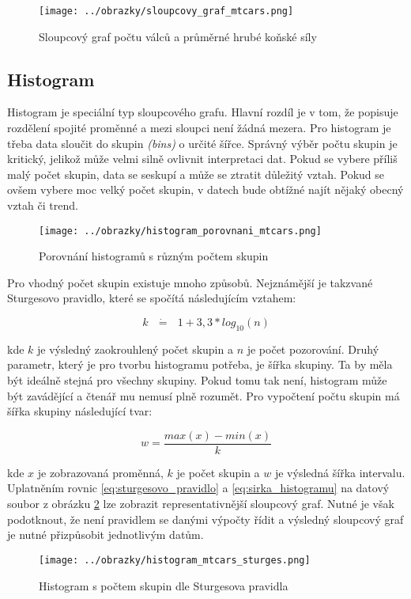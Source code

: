 \begin{figure}[H]
    \centering
    \texttt{[image: ../obrazky/sloupcovy\_graf\_mtcars.png]}
    \caption{Sloupcový graf počtu válců a průměrné hrubé koňské síly} 
    \label{fig:sloupcovy_graf_mtcars}
\end{figure}

\subsection{Histogram}

Histogram je speciální typ sloupcového grafu. Hlavní rozdíl je v tom, že popisuje rozdělení spojité proměnné a mezi sloupci není žádná mezera.
Pro histogram je třeba data sloučit do skupin \textit{(bins)} o určité šířce. Správný výběr počtu skupin je kritický, jelikož může velmi
silně ovlivnit interpretaci dat. Pokud se vybere příliš malý počet skupin, data se seskupí a může se ztratit důležitý vztah. Pokud se ovšem
vybere moc velký počet skupin, v datech bude obtížné najít nějaký obecný vztah či trend.

\begin{figure}[H]
    \centering
    \texttt{[image: ../obrazky/histogram\_porovnani\_mtcars.png]}
    \caption{Porovnání histogramů s různým počtem skupin} 
    \label{fig:histogram_porovnani_mtcars}
\end{figure}

Pro vhodný počet skupin existuje mnoho způsobů. Nejznámější je takzvané Sturgesovo pravidlo, které se spočítá následujícím vztahem:

\begin{equation}
    \label{eq:sturgesovo_pravidlo}
    k \text{ } \dot{\mathbf{=}} \text{ } 1 + 3,3 * log_{10}(n)
\end{equation}

kde $k$ je výsledný zaokrouhlený počet skupin 
a $n$ je počet pozorování. Druhý parametr, který je pro tvorbu histogramu potřeba, je šířka skupiny.
Ta by měla být ideálně stejná pro všechny skupiny. Pokud tomu tak není, histogram může být zavádějící a čtenář mu nemusí plně rozumět.
Pro vypočtení počtu skupin má šířka skupiny následující tvar:

\begin{equation}
    \label{eq:sirka_histogramu}
    w = \frac{max(x) - min(x)}{k}
\end{equation}

kde $x$ je zobrazovaná proměnná, $k$ je počet skupin a $w$ je výsledná šířka intervalu. 
{\color{red}
Uplatněním rovnic \ref{eq:sturgesovo_pravidlo} a \ref{eq:sirka_histogramu} na datový soubor z obrázku \ref{fig:histogram_porovnani_mtcars}
lze zobrazit representativnější sloupcový graf. Nutné je však podotknout, že není pravidlem se danými výpočty řídit a výsledný
sloupcový graf je nutné přizpůsobit jednotlivým datům.
}
\begin{figure}[H]
    \centering
    \texttt{[image: ../obrazky/histogram\_mtcars\_sturges.png]}
    \caption{Histogram s počtem skupin dle Sturgesova pravidla} 
    \label{fig:histogram_mtcars_sturges}
\end{figure}

